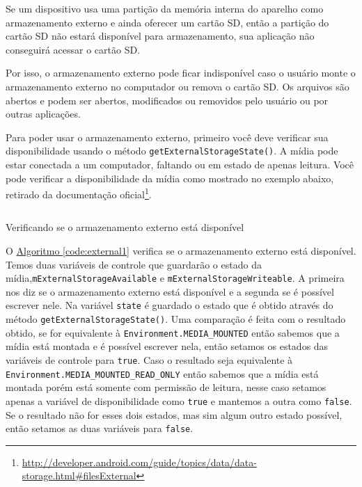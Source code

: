 \documentclass[a4paper,12pt,brazil,oneside]{book}
\begin{document}
		Se um dispositivo usa uma partição da memória interna do aparelho como armazenamento externo e ainda oferecer um cartão SD, então a partição do cartão SD não estará disponível para armazenamento, sua aplicação não conseguirá acessar o cartão SD. 

		Por isso, o armazenamento externo pode ficar indisponível caso o usuário monte o armazenamento externo no computador ou remova o cartão SD. Os arquivos são abertos e podem ser abertos, modificados ou removidos pelo usuário ou por outras aplicações.

		Para poder usar o armazenamento externo, primeiro você deve verificar sua disponibilidade usando o método \texttt{getExternalStorageState()}. A mídia pode estar conectada a um computador, faltando ou em estado de apenas leitura. Você pode verificar a disponibilidade da mídia como mostrado no exemplo abaixo, retirado da documentação oficial\footnote{\href{http://developer.android.com/guide/topics/data/data-storage.html\#filesExternal}{http://developer.android.com/guide/topics/data/data-storage.html\#filesExternal}}.

		\begin{listing}[H]
		\inputminted[linenos=true,fontsize=\small,frame=lines, framesep=2mm, tabsize=2,numbersep=5pt]{java}{src/api/storage/external1.java}
		\caption{Verificando se o armazenamento externo está disponível}
		\label{code:external1}
		\end{listing} 	

		O \hyperref[code:external1]{Algoritmo \ref*{code:external1}} verifica se o armazenamento externo está disponível. Temos duas variáveis de controle que guardarão o estado da mídia,\texttt{mExternalStorageAvailable} e \texttt{mExternalStorageWriteable}. A primeira nos diz se o armazenamento externo está disponível e a segunda se é possível escrever nele. Na variável \texttt{state} é guardado o estado que é obtido através do método \texttt{getExternalStorageState()}. Uma comparação é feita com o resultado obtido, se for equivalente à \texttt{Environment.MEDIA\_MOUNTED} então sabemos que a mídia está montada e é possível escrever nela, então setamos os estados das variáveis de controle para \texttt{true}. Caso o resultado seja equivalente à \texttt{Environment.MEDIA\_MOUNTED\_READ\_ONLY} então sabemos que a mídia está montada porém está somente com permissão de leitura, nesse caso setamos apenas a variável de disponibilidade como \texttt{true} e mantemos a outra como \texttt{false}. Se o resultado não for esses dois estados, mas sim algum outro estado possível, então setamos as duas variáveis para \texttt{false}.
\end{document}
